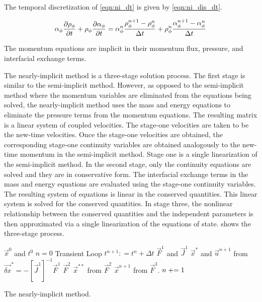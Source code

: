 The temporal discretization of \eqref{eqn:ni_dt} is given by \eqref{eqn:ni_dis_dt}.

\begin{equation}
\label{eqn:ni_dis_dt}
\alpha_{\phi} \frac{\partial \rho_{\phi}}{\partial t} + \rho_{\phi} \frac{\partial \alpha_{\phi}}{\partial t} = \alpha^{n}_{\phi} \frac{ \rho^{n+1}_{\phi} - \rho^{n}_{\phi}}{\dt{}} + \rho^{n}_{\phi} \frac{\alpha^{n+1}_{\phi} - \alpha^{n}_{\phi} }{\dt}
\end{equation}

The momentum equations are implicit in their momentum flux, pressure, and interfacial exchange terms.

The nearly-implicit method is a three-stage solution process.
The first stage is similar to the semi-implicit method.
However, as opposed to the semi-implicit method where the momentum variables are eliminated from the equations being solved, the nearly-implicit method uses the mass and energy equations to eliminate the pressure terms from the momentum equations.
The resulting matrix is a linear system of coupled velocities.
The stage-one velocities are taken to be the new-time velocities.
Once the stage-one velocities are obtained, the corresponding stage-one continuity variables are obtained analogously to the new-time momentum in the semi-implicit method.
Stage one is a single linearization of the semi-implicit method.
In the second stage, only the continuity equations are solved and they are in conservative form.
The interfacial exchange terms in the mass and energy equations are evaluated using the stage-one continuity variables.
The resulting system of equations is linear in the conserved quantities.
This linear system is solved for the conserved quantities.
In stage three, the nonlinear relationship between the conserved quantities and the independent parameters is then approximated via a single linearization of the equations of state.
 shows the three-stage process.

\begin{algo}[ht!]
\setlength{\baselineskip}{0.625\baselineskip}
\begin{algorithmic}[1]
\Require $\vec{x}^{0}$ and $t^{0}$
\Set $n = 0$
\Loop \; Transient Loop
    \Set $t^{n+1} : = t^{n} + \Delta t$
	\Calculate $\vec{F}^{1}$ and $\vec{J}^{1}$
	\Calculate $\vec{x}^{*}$ and $\vec{u}^{n+1}$ from $\vec{\delta x}^{*} = -\left[\vec{J}^{1}\right]^{-1} \vec{F}^{1}$
	\Calculate $\vec{F}^{2}$
	\Calculate $\vec{x}^{**}$ from $\vec{F}^{2}$
	\Calculate $\vec{x}^{n+1}$ from $\vec{F}^{3}$.
	\Set $n \mathrel{+}= 1$
\EndLoop
\end{algorithmic}
\caption{The nearly-implicit method.}
\label{alg:ni}
\end{algo}

